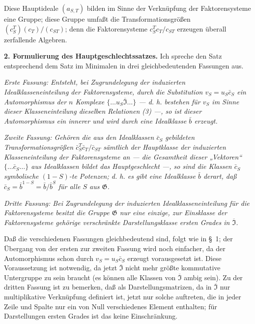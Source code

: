 Diese Hauptideale \((a_{S,T})\) bilden im Sinne der Verknüpfung der Faktorensysteme eine Gruppe; diese Gruppe umfaßt die Transformationsgrößen \((c_S^T)(c_T)/(c_{ST})\); denn die Faktorensysteme \(c_S^Tc_T/c_{ST}\) erzeugen überall zerfallende Algebren.

\noindent\textbf{2. Formulierung des Hauptgeschlechtssatzes.} Ich spreche den Satz entsprechend dem Satz im Minimalen in drei gleichbedeutenden Fassungen aus.

\emph{Erste Fassung: Entsteht, bei Zugrundelegung der induzierten Idealklasseneinteilung der Faktorensysteme, durch die Substitution \(v_S=u_S\bar c_S\) ein Automorphismus der \(n\) Komplexe \(\{\ldots u_S\overline{\mathfrak I}\ldots\}\) --- d. h. bestehen für \(v_S\) im Sinne dieser Klasseneinteilung dieselben Relationen (3) ---, so ist dieser Automorphismus ein innerer und wird durch eine Idealklasse \(\bar b\) erzeugt.}

\emph{Zweite Fassung: Gehören die aus den Idealklassen \(\bar c_S\) gebildeten Transformationsgrößen \(\bar c_S^T\bar c_T/\bar c_{ST}\) sämtlich der Hauptklasse der induzierten Klasseneinteilung der Faktorensysteme an --- die Gesamtheit dieser „Vektoren“ \(\{\ldots\bar c_S\ldots\}\) aus Idealklassen bildet das Hauptgeschlecht ---, so sind die Klassen \(\bar c_S\) symbolische \((1-S)\)-te Potenzen; d. h. es gibt eine Idealklasse \(\bar b\) derart, daß \(\bar c_S=\bar b^{1-S}=\bar b/\bar b^S\) für alle \(S\) aus \(\mathfrak G\).}

\emph{Dritte Fassung: Bei Zugrundelegung der induzierten Idealklasseneinteilung für die Faktorensysteme besitzt die Gruppe \(\mathfrak G\) nur eine einzige, zur Einsklasse der Faktorensysteme gehörige verschränkte Darstellungsklasse ersten Grades in \(\overline{\mathfrak I}\).}

Daß die verschiedenen Fassungen gleichbedeutend sind, folgt wie in §~1; der Übergang von der ersten zur zweiten Fassung wird noch einfacher, da der Automorphismus schon durch \(v_S=u_S\bar c_S\) erzeugt vorausgesetzt ist. Diese Voraussetzung ist notwendig, da jetzt \(\overline{\mathfrak I}\) nicht mehr größte kommutative Untergruppe zu sein braucht (es können alle Klassen von \(\overline{\mathfrak I}\) ambig sein). Zu der dritten Fassung ist zu bemerken, daß als Darstellungsmatrizen, da in \(\overline{\mathfrak I}\) nur multiplikative Verknüpfung definiert ist, jetzt nur solche auftreten, die in jeder Zeile und Spalte nur ein von Null verschiedenes Element enthalten; für Darstellungen ersten Grades ist das keine Einschränkung.

